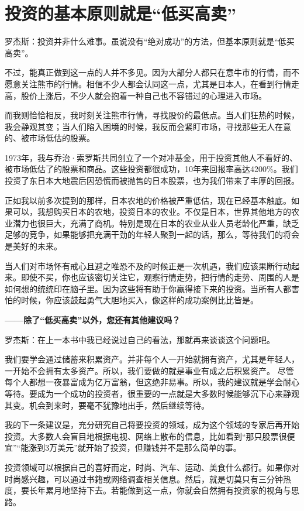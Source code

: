 \documentclass[UTF8,a4paper,zihao=-4,fontset = ubuntu]{ctexart} %
\begin{document}
\section{投资的基本原则就是“低买高卖”}

罗杰斯：投资并非什么难事。虽说没有“绝对成功”的方法，但基本原则就是“低买高卖”。

不过，能真正做到这一点的人并不多见。因为大部分人都只在意牛市的行情，而不愿意关注熊市的行情。相信不少人都会认同这一点，尤其是日本人，在看到行情走高，股价上涨后，不少人就会抱着一种自己也不容错过的心理进入市场。

而我则恰恰相反，我时刻关注熊市行情，寻找股价的最低点。当人们狂热的时候，我会静观其变；当人们陷入困境的时候，我反而会紧盯市场，寻找那些无人在意的、被市场低估的股票。

1973年，我与乔治·索罗斯共同创立了一个对冲基金，用于投资其他人不看好的、被市场低估了的股票和商品。这些投资都很成功，10年来回报率高达4200\%。我们投资了东日本大地震后因恐慌而被抛售的日本股票，也为我们带来了丰厚的回报。

正如我以前多次提到的那样，日本农地的价格被严重低估，现在已经基本触底。如果可以，我想购买日本的农地，投资日本的农业。不仅是日本，世界其他地方的农业潜力也很巨大，充满了商机。特别是现在日本的农业从业人员老龄化严重，缺乏足够的竞争，如果能够把充满干劲的年轻人聚到一起的话，那么，等待我们的将会是美好的未来。

当人们对市场怀有戒心且避之唯恐不及的时候正是一次机遇，我们应该果断行动起来。即使不买，你也应该密切关注它，观察行情走势，把行情的走势、周围的人是如何想的统统印在脑子里。因为这些将有助于你赢得接下来的投资。当所有人都害怕的时候，你应该鼓起勇气大胆地买入，像这样的成功案例比比皆是。

\textbf{——除了“低买高卖”以外，您还有其他建议吗？}

罗杰斯：在上一本书中我已经说过自己的看法，那就再来谈谈这个问题吧。

我们要学会通过储蓄来积累资产。并非每个人一开始就拥有资产，尤其是年轻人，一开始不会拥有太多资产。所以，我们要做的就是事业有成之后积累资产。
尽管每个人都想一夜暴富成为亿万富翁，但这绝非易事。所以，我的建议就是学会耐心等待。要成为一个成功的投资者，很重要的一点就是大多数时候能够沉下心来静观其变。机会到来时，要毫不犹豫地出手，然后继续等待。

我的下一条建议是，充分研究自己将要投资的领域，成为这个领域的专家后再开始投资。大多数人会盲目地根据电视、网络上散布的信息，比如看到“那只股票很便宜”“能涨到3万美元”就开始了投资，但赚钱并不是那么简单的事。

投资领域可以根据自己的喜好而定，时尚、汽车、运动、美食什么都行。如果你对时尚感兴趣，可以通过书籍或网络调查相关信息。然后，就是切莫只有三分钟热度，要长年累月地坚持下去。若能做到这一点，你就会自然拥有投资家的视角与思路。
\end{document}
